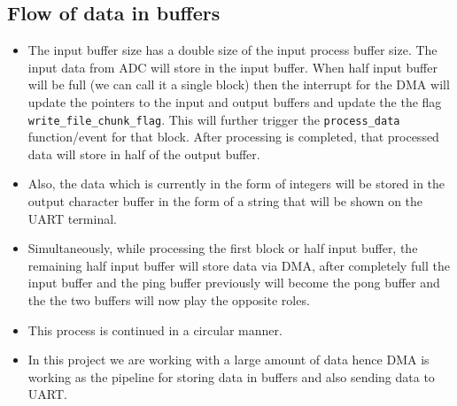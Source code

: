 \documentclass[11pt]{article}
\begin{document}
\subsection{Flow of data in buffers}
\label{sec:org941ab67}

\begin{itemize}
\item The input buffer size has a double size of the input process buffer size. The input data from ADC will store in the input buffer. When half input buffer will be full (we can call it a single block) then the interrupt for the DMA will update the pointers to the input and output buffers and update the the flag \texttt{write\_file\_chunk\_flag}. This will further trigger the \texttt{process\_data} function/event for that block. After processing is completed, that processed data will store in half of the output buffer.
\item Also, the data which is currently in the form of integers will be stored in the output character buffer in the form of a string that will be shown on the UART terminal.
\item Simultaneously, while processing the first block or half input buffer, the remaining half input buffer will store data via DMA, after completely full the input buffer and the ping buffer previously will become the pong buffer and the the two buffers will now play the opposite roles.
\item This process is continued in a circular manner.
\item In this project we are working with a large amount of data hence DMA is working as the pipeline for storing data in buffers and also sending data to UART.
\end{itemize}
\end{document}
